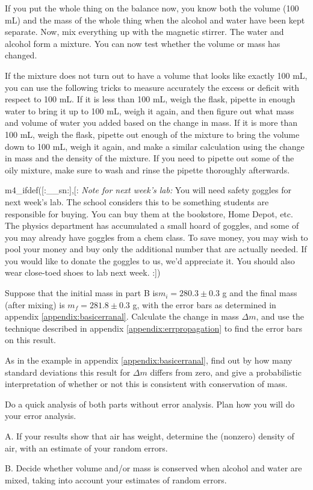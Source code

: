 If you put the whole thing on the balance now, you know both
the volume (100 mL) and the mass of the whole thing when the
alcohol and water have been kept separate.  Now, mix
everything up with the magnetic stirrer.  The water and
alcohol form a mixture.  You can now test whether the volume
or mass has changed.

If the mixture does not turn out to have a volume that looks
like exactly 100 mL, you can use the following tricks to
measure accurately the excess or deficit with respect to 100
mL.  If it is less than 100 mL, weigh the flask, pipette in
enough water to bring it up to 100 mL, weigh it again, and
then figure out what mass and volume of water you added
based on the change in mass.  If it is more than 100 mL,
weigh the flask, pipette out enough of the mixture to bring
the volume down to 100 mL, weigh it again, and make a
similar calculation using the change in mass and the density
of the mixture.  If you need to pipette out some of the oily
mixture, make sure
to wash and rinse the pipette thoroughly afterwards.

m4_ifdef([:__sn:],[:%
\emph{Note for next week's lab:} You will need safety goggles for next week's lab.
The school considers this to be something students are responsible for buying.
You can buy them at the bookstore, Home Depot, etc. The physics department has accumulated a small
hoard of goggles, and some of you may already have goggles from a chem class. To save money, you may wish to pool your money and buy only the
additional number that are actually needed. If you would like to donate the goggles to us, we'd
appreciate it. You should also wear close-toed shoes to lab next week.
:])

\prelab

\prelabquestion  Suppose that the initial mass in part B is\linebreak[4]
$m_i=280.3\pm0.3$ g and the final mass (after mixing) is $m_f=281.8\pm0.3$ g,
with the error bars as determined in appendix \ref{appendix:basicerranal}.
Calculate the change in mass $\Delta m$, and use the technique described in 
appendix \ref{appendix:errpropagation} to find the error bars on this result.

\prelabquestion As in the example in appendix \ref{appendix:basicerranal},
find out by how many standard deviations this result for $\Delta m$ differs
from zero, and give a probabilistic interpretation of whether or not this is consistent
with conservation of mass.

\selfcheck

Do a quick analysis of both parts without error analysis.
Plan how you will do your error analysis. 

\analysis

A. If your results show that air has weight, determine the
(nonzero) density of air, with an estimate of your random errors.

B. Decide whether volume and/or mass is conserved when
alcohol and water are mixed, taking into account your
estimates of random errors.
